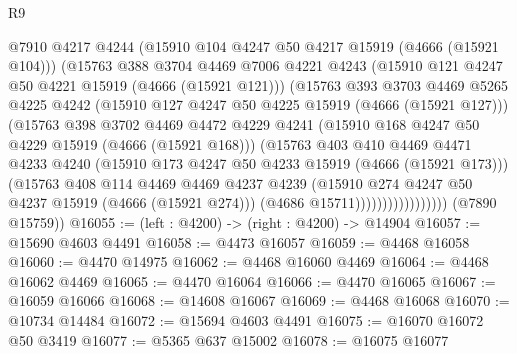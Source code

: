 \begin{lexlean}{R9}
\begin{coremodule}
                            @7910
                            @4217
                            @4244
                            (@15910 @104 @4247 @50 @4217 @15919 (@4666 (@15921 @104)))
                            (@15763
                              @388
                              @3704
                              @4469
                              @7006
                              @4221
                              @4243
                              (@15910 @121 @4247 @50 @4221 @15919 (@4666 (@15921 @121)))
                              (@15763
                                @393
                                @3703
                                @4469
                                @5265
                                @4225
                                @4242
                                (@15910 @127 @4247 @50 @4225 @15919 (@4666 (@15921 @127)))
                                (@15763
                                  @398
                                  @3702
                                  @4469
                                  @4472
                                  @4229
                                  @4241
                                  (@15910 @168 @4247 @50 @4229 @15919 (@4666 (@15921 @168)))
                                  (@15763
                                    @403
                                    @410
                                    @4469
                                    @4471
                                    @4233
                                    @4240
                                    (@15910 @173 @4247 @50 @4233 @15919 (@4666 (@15921 @173)))
                                    (@15763
                                      @408
                                      @114
                                      @4469
                                      @4469
                                      @4237
                                      @4239
                                      (@15910 @274 @4247 @50 @4237 @15919 (@4666 (@15921 @274)))
                                      (@4686 @15711)))))))))))))))))
      (@7890 @15759))
@16055 := (left : @4200) -> (right : @4200) -> @14904
@16057 := @15690 @4603 @4491
@16058 := @4473 @16057
@16059 := @4468 @16058
@16060 := @4470 @14975
@16062 := @4468 @16060 @4469
@16064 := @4468 @16062 @4469
@16065 := @4470 @16064
@16066 := @4470 @16065
@16067 := @16059 @16066
@16068 := @14608 @16067
@16069 := @4468 @16068
@16070 := @10734 @14484
@16072 := @15694 @4603 @4491
@16075 := @16070 @16072 @50 @3419
@16077 := @5365 @637 @15002
@16078 := @16075 @16077

\end{coremodule}
\end{lexlean}
